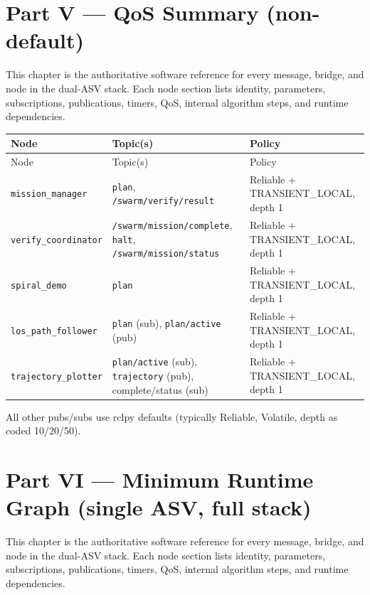\chapter{Part V --- QoS Summary (non-default)}
\label{ch:ros-catalog}

This chapter is the authoritative software reference for every message, bridge, and node in the dual-ASV stack. Each node section lists identity, parameters, subscriptions, publications, timers, QoS, internal algorithm steps, and runtime dependencies.


\begin{center}
\small
\begin{longtable}{@{}llp{7.2cm}@{}}
\toprule
Node & Topic(s) & Policy \\
\midrule
\endfirsthead
\toprule
Node & Topic(s) & Policy \\
\midrule
\endhead
\texttt{mission\_manager} & \texttt{plan}, \texttt{/swarm/verify/result} & Reliable + TRANSIENT\_LOCAL, depth 1 \\
\texttt{verify\_coordinator} & \texttt{/swarm/mission/complete}, \texttt{halt}, \texttt{/swarm/mission/status} & Reliable + TRANSIENT\_LOCAL, depth 1 \\
\texttt{spiral\_demo} & \texttt{plan} & Reliable + TRANSIENT\_LOCAL, depth 1 \\
\texttt{los\_path\_follower} & \texttt{plan} (sub), \texttt{plan/active} (pub) & Reliable + TRANSIENT\_LOCAL, depth 1 \\
\texttt{trajectory\_plotter} & \texttt{plan/active} (sub), \texttt{trajectory} (pub), complete/status (sub) & Reliable + TRANSIENT\_LOCAL, depth 1 \\
\bottomrule
\end{longtable}
\end{center}


All other pubs/subs use rclpy defaults (typically Reliable, Volatile, depth as coded 10/20/50).




\chapter{Part VI --- Minimum Runtime Graph (single ASV, full stack)}
\label{ch:ros-catalog}

This chapter is the authoritative software reference for every message, bridge, and node in the dual-ASV stack. Each node section lists identity, parameters, subscriptions, publications, timers, QoS, internal algorithm steps, and runtime dependencies.


